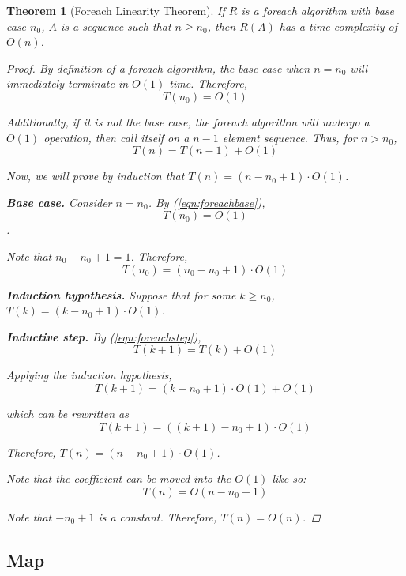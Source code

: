 \documentclass{article}
\newtheorem{theorem}{Theorem}
\theoremstyle{definition}
\begin{document}
\begin{theorem}[Foreach Linearity Theorem]
    If $R$ is a foreach algorithm with base case $n_0$, $A$ is a sequence such that $n \geq n_0$, then $R(A)$ has a time complexity of $O(n)$.
    \label{thm:foreachn}

    \begin{proof}
        By definition of a foreach algorithm, the base case when $n = n_0$ will immediately terminate in $O(1)$ time. Therefore, 
        \begin{equation}
            T(n_0) = O(1)
            \label{eqn:foreachbase}
        \end{equation}

        Additionally, if it is not the base case, the foreach algorithm will undergo a $O(1)$ operation, then call itself on a $n - 1$ element sequence. Thus, for $n > n_0$,
        \begin{equation}
            T(n) = T(n - 1) + O(1)
            \label{eqn:foreachstep}
        \end{equation}

        Now, we will prove by induction that $T(n) = (n - n_0 + 1) \cdot O(1)$.

        \textbf{Base case.} Consider $n = n_0$. By (\ref{eqn:foreachbase}), $$T(n_0) = O(1)$$.

        Note that $n_0 - n_0 + 1 = 1$. Therefore,
        $$T(n_0) = (n_0 - n_0 + 1) \cdot O(1)$$

        \textbf{Induction hypothesis.} Suppose that for some $k \geq n_0$, $T(k) = (k - n_0 + 1) \cdot O(1)$.

        \textbf{Inductive step.} By (\ref{eqn:foreachstep}),
        $$T(k+1) = T(k) + O(1)$$

        Applying the induction hypothesis,
        $$T(k+1) = (k - n_0 + 1) \cdot O(1) + O(1)$$

        which can be rewritten as
        $$T(k+1) = ((k + 1) - n_0 + 1) \cdot O(1)$$

        Therefore, $T(n) = (n - n_0 + 1) \cdot O(1)$.

        Note that the coefficient can be moved into the $O(1)$ like so:
        $$T(n) = O(n - n_0 + 1)$$

        Note that $-n_0 + 1$ is a constant. Therefore, $T(n) = O(n)$.

    \end{proof}
\end{theorem}

\subsection{Map}
\end{document}
